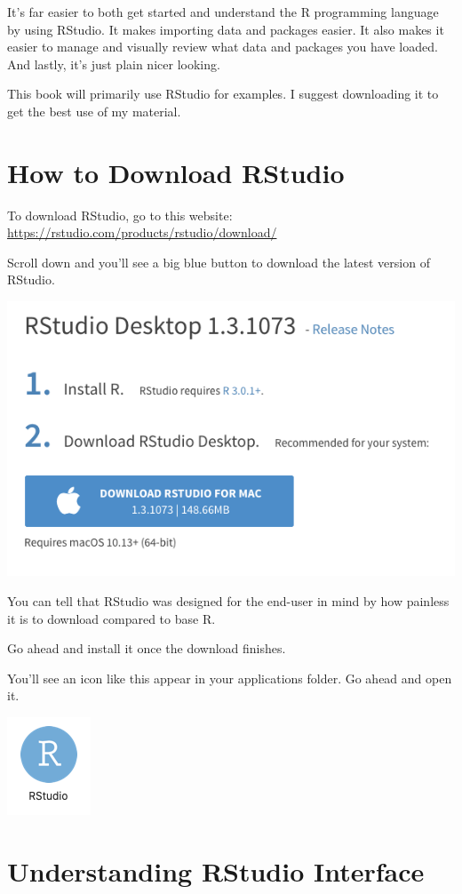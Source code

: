 \documentclass[
]{book}
\begin{document}
It's far easier to both get started and understand the R programming language by using RStudio. It makes importing data and packages easier. It also makes it easier to manage and visually review what data and packages you have loaded. And lastly, it's just plain nicer looking.

This book will primarily use RStudio for examples. I suggest downloading it to get the best use of my material.

\hypertarget{how-to-download-rstudio}{%
\section{How to Download RStudio}\label{how-to-download-rstudio}}

To download RStudio, go to this website: \url{https://rstudio.com/products/rstudio/download/}

Scroll down and you'll see a big blue button to download the latest version of RStudio.

\begin{center}\includegraphics[width=0.5\linewidth]{1.11_RStudio_Download} \end{center}

You can tell that RStudio was designed for the end-user in mind by how painless it is to download compared to base R.

Go ahead and install it once the download finishes.

You'll see an icon like this appear in your applications folder. Go ahead and open it.

\begin{center}\includegraphics[width=0.1\linewidth]{1.13.1_RStudio_Logo} \end{center}

\hypertarget{understanding-rstudio-interface}{%
\section{Understanding RStudio Interface}\label{understanding-rstudio-interface}}
\end{document}
